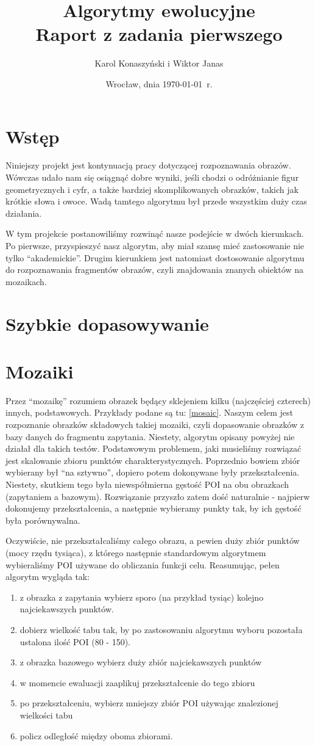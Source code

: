 \documentclass[a4paper,12pt,leqno]{article}
\title{\textbf{Algorytmy ewolucyjne}\\
       {\Large Raport z zadania pierwszego}\\[-1ex]}
\author{Karol Konaszyński i Wiktor Janas}
\date{Wrocław, dnia \today\ r.}
\begin{document}
\section{Wstęp}
Niniejszy projekt jest kontynuacją pracy dotyczącej rozpoznawania obrazów. Wówczas udało nam się osiągnąć dobre wyniki, jeśli chodzi o odróżnianie figur geometrycznych i cyfr, a także bardziej
skomplikowanych obrazków, takich jak krótkie słowa i owoce. Wadą tamtego algorytmu był przede wszystkim duży czas działania.

W tym projekcie postanowiliśmy rozwinąć nasze podejście w dwóch kierunkach. Po pierwsze, przyspieszyć nasz algorytm, aby miał szansę mieć zastosowanie nie tylko ``akademickie''.
Drugim kierunkiem jest natomiast dostosowanie algorytmu do rozpoznawania fragmentów obrazów, czyli znajdowania znanych obiektów na mozaikach.

\section{Szybkie dopasowywanie}

\section{Mozaiki}

Przez ``mozaikę'' rozumiem obrazek będący sklejeniem kilku (najczęściej czterech) innych, podstawowych. Przykłady podane są tu: \ref{mosaic}.
Naszym celem jest rozpoznanie obrazków składowych takiej mozaiki, czyli dopasowanie obrazków z bazy danych do fragmentu zapytania.
Niestety, algorytm opisany powyżej nie działał dla takich testów. Podstawowym problemem, jaki musieliśmy rozwiązać jest skalowanie zbioru punktów charakterystycznych. 
Poprzednio bowiem zbiór wybierany był ``na sztywno'', dopiero potem dokonywane były przekształcenia. Niestety, skutkiem tego była niewspółmierna gęstość POI na obu obrazkach 
(zapytaniem a bazowym). Rozwiązanie przyszło zatem dość naturalnie - najpierw dokonujemy przekształcenia, a następnie wybieramy punkty tak, by ich gęstość była porównywalna. 

Oczywiście, nie przekształcaliśmy całego obrazu, a pewien duży zbiór punktów (mocy rzędu tysiąca), z którego następnie standardowym algorytmem wybieraliśmy POI używane do obliczania funkcji celu.
Reasumując, pełen algorytm wygląda tak:
\begin{enumerate}
 \item z obrazka z zapytania wybierz sporo (na przykład tysiąc) kolejno najciekawszych punktów.
 \item dobierz wielkość tabu tak, by po zastosowaniu algorytmu wyboru pozostała ustalona ilość POI (80 - 150).
 \item z obrazka bazowego wybierz duży zbiór najciekawszych punktów
 \item w momencie ewaluacji zaaplikuj przekształcenie do tego zbioru
 \item po przekształceniu, wybierz mniejszy zbiór POI używając znalezionej wielkości tabu
 \item policz odległość między oboma zbiorami.
\end{enumerate}
\end{document}
